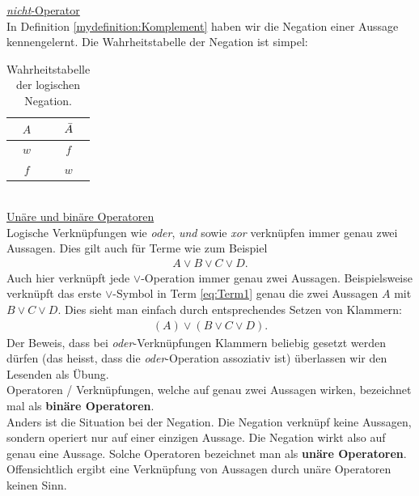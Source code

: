 \noindent
\underline{\textit{nicht}-Operator}\\
In Definition \cref{mydefinition:Komplement} haben wir die Negation einer Aussage kennengelernt. Die Wahrheitstabelle der Negation ist simpel:
\begin{table}[H]
	\begin{center}
		\begin{tabular}{c|c}
			$A$ & $\Bar{A}$ \\ \hline
			$w$ & $f$       \\
			$f$ & $w$
		\end{tabular}
	\end{center}
	\caption{Wahrheitstabelle der logischen Negation.}
	\label{table:not}
\end{table}
\noindent
{}\\

\noindent
\underline{Unäre und binäre Operatoren}\\
Logische Verknüpfungen wie \textit{oder}, \textit{und} sowie \textit{xor} verknüpfen immer genau zwei Aussagen. Dies gilt auch für Terme wie zum Beispiel
\begin{align}\label{eq:Term1}
	A\lor B\lor C\lor D.
\end{align}
Auch hier verknüpft jede $\lor$-Operation immer genau zwei Aussagen. Beispielsweise verknüpft das erste $\lor$-Symbol in Term \cref{eq:Term1} genau die zwei Aussagen $A$ mit $B\lor C\lor D$. Dies sieht man einfach durch entsprechendes Setzen von Klammern:
\begin{align*}
	(A)\lor (B\lor C\lor D).
\end{align*}
Der Beweis, dass bei \textit{oder}-Verknüpfungen Klammern beliebig gesetzt werden dürfen (das heisst, dass die \textit{oder}-Operation assoziativ ist) überlassen wir den Lesenden als Übung.\\
Operatoren / Verknüpfungen, welche auf genau zwei Aussagen wirken, bezeichnet mal als \textbf{binäre Operatoren}.\\

\noindent
Anders ist die Situation bei der Negation. Die Negation verknüpf keine Aussagen, sondern operiert nur auf einer einzigen Aussage. Die Negation wirkt also auf genau eine Aussage. Solche Operatoren bezeichnet man als \textbf{unäre Operatoren}. Offensichtlich ergibt eine Verknüpfung von Aussagen durch unäre Operatoren keinen Sinn.
\clearpage


